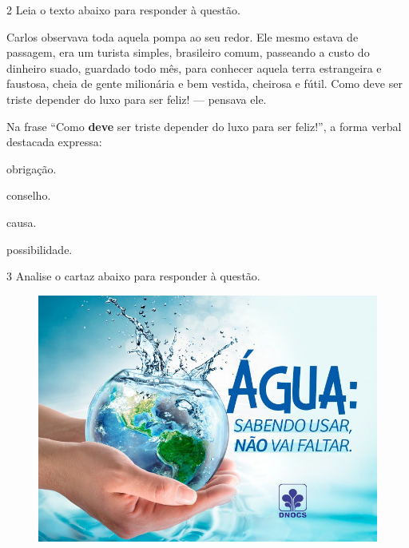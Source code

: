 \num{2} Leia o texto abaixo para responder à questão. 
\enlargethispage{\baselineskip}

\begin{myquote}
Carlos observava toda aquela pompa ao seu redor. Ele mesmo estava de passagem,
era um turista simples, brasileiro comum, passeando a custo do dinheiro suado, 
guardado todo mês, para conhecer aquela terra estrangeira e faustosa, cheia de 
gente milionária e bem vestida, cheirosa e fútil. Como deve ser triste depender
do luxo para ser feliz! --- pensava ele.


\end{myquote}

Na frase ``Como \textbf{deve} ser triste depender do luxo para ser feliz!'', 
a forma verbal destacada expressa:

\begin{multicols}{2}
\begin{escolha}
  
  \item obrigação.
  
  \item conselho.
  
  \item causa.
  
  \item possibilidade.

\end{escolha}
\end{multicols}

\pagebreak
\num{3} Analise o cartaz abaixo para responder à questão.

\begin{figure}[htpb!]
\includegraphics[width=\textwidth]{./imgSAEB_7_POR/media/image13.png}
\end{figure}

